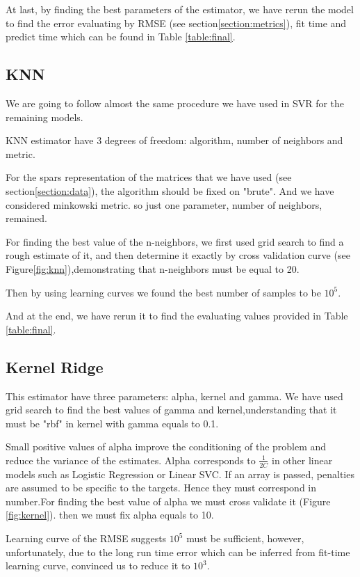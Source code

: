 \documentclass[a4paper,12pt]{article}
\begin{document}
\begin{multicols}{2}
At last, by finding the best parameters of the estimator, we have rerun the model to find the error evaluating by RMSE (see section\ref{section:metrics}), fit time and predict time which can be found in Table \ref{table:final}.
\subsection{KNN}
We are going to follow almost the same procedure we have used in SVR for the remaining models.

KNN estimator have 3 degrees of freedom: algorithm, number of neighbors and metric.

For the spars representation of the matrices that we have used (see section\ref{section:data}), the algorithm should be fixed on "brute". And we have considered minkowski metric. so just one parameter, number of neighbors, remained.

For finding the best value of the n-neighbors, we first used grid search to find a rough estimate of it, and then determine it exactly by cross validation curve (see Figure\ref{fig:knn}),demonstrating that n-neighbors must be equal to 20.

Then by using learning curves we found the best number of samples to be $10^5$.

And at the end, we have rerun it to find the evaluating values provided in Table \ref{table:final}.
\subsection{Kernel Ridge}
This estimator have three parameters: alpha, kernel and gamma. 
We have used grid search to find the best values of gamma and kernel,understanding that it must be "rbf" in kernel with gamma equals to 0.1.

Small positive values of alpha improve the conditioning of the problem and reduce the variance of the estimates. Alpha corresponds to $\frac{1}{2C}$ in other linear models such as Logistic Regression or Linear SVC. If an array is passed, penalties are assumed to be specific to the targets. Hence they must correspond in number\cite{alpha}.For finding the best value of alpha we must cross validate it (Figure \ref{fig:kernel}). then we must fix alpha equals to 10.

Learning curve of the RMSE suggests $10^5$ must be sufficient, however, unfortunately, due to the long run time error which can be inferred from fit-time learning curve, convinced us to reduce it to $10^3$.


\end{multicols}
\end{document}
